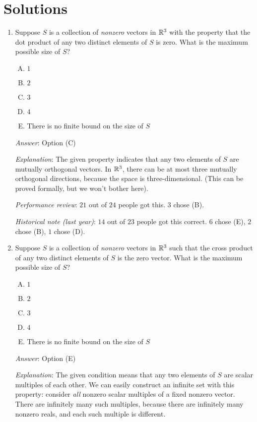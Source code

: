\documentclass[10pt]{amsart}
\begin{document}
\section{Solutions}
\begin{enumerate}

\item Suppose $S$ is a collection of {\em nonzero} vectors in $\mathbb{R}^3$
  with the property that the dot product of any two distinct elements
  of $S$ is zero. What is the maximum possible size of $S$?

  \begin{enumerate}[(A)]
  \item $1$
  \item $2$
  \item $3$
  \item $4$
  \item There is no finite bound on the size of $S$
  \end{enumerate}

  {\em Answer}: Option (C)

  {\em Explanation}: The given property indicates that any two
  elements of $S$ are mutually orthogonal vectors. In $\mathbb{R}^3$, there
  can be at most three mutually orthogonal directions, because the
  space is three-dimensional. (This can be proved formally, but we
  won't bother here).

  {\em Performance review}: $21$ out of $24$ people got this. $3$ chose (B).

  {\em Historical note (last year)}: $14$ out of $23$ people got this
  correct. $6$ chose (E), $2$ chose (B), $1$ chose (D).

\item Suppose $S$ is a collection of {\em nonzero} vectors in $\mathbb{R}^3$
  such that the cross product of any two distinct elements of $S$ is the
  zero vector. What is the maximum possible size of $S$?

  \begin{enumerate}[(A)]
  \item $1$
  \item $2$
  \item $3$
  \item $4$
  \item There is no finite bound on the size of $S$
  \end{enumerate}

  {\em Answer}: Option (E)

  {\em Explanation}: The given condition means that any two elements
  of $S$ are scalar multiples of each other. We can easily construct
  an infinite set with this property: consider {\em all} nonzero
  scalar multiples of a fixed nonzero vector. There are infinitely
  many such multiples, because there are infinitely many nonzero
  reals, and each such multiple is different.


\end{enumerate}
\end{document}
